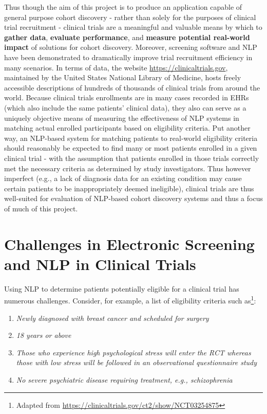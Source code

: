 \documentclass[../main.tex]{subfiles}
\begin{document}
Thus though the aim of this project is to produce an application capable of general purpose cohort discovery - rather than solely for the purposes of clinical trial recruitment - clinical trials are a meaningful and valuable means by which to \textbf{gather data}, \textbf{evaluate performance}, and \textbf{measure potential real-world impact} of solutions for cohort discovery. Moreover, screening software and NLP have been demonstrated to dramatically improve trial recruitment efficiency in many scenarios.
In terms of data, the website \url{https://clinicaltrials.gov}, maintained by the United States National Library of Medicine, hosts freely accessible descriptions of hundreds of thousands of clinical trials from around the world. Because clinical trials enrollments are in many cases recorded in EHRs (which also include the same patients' clinical data), they also can serve as a uniquely objective means of measuring the effectiveness of NLP systems in matching actual enrolled participants based on eligibility criteria. Put another way, an NLP-based system for matching patients to real-world eligibility criteria should reasonably be expected to find many or most patients enrolled in a given clinical trial - with the assumption that patients enrolled in those trials correctly met the necessary criteria as determined by study investigators. Thus however imperfect (e.g., a lack of diagnosis data for an existing condition may cause certain patients to be inappropriately deemed ineligible), clinical trials are thus well-suited for evaluation of NLP-based cohort discovery systems and thus a focus of much of this project.

\section{Challenges in Electronic Screening and NLP in Clinical Trials}

Using NLP to determine patients potentially eligible for a clinical trial has numerous challenges. Consider, for example, a list of eligibility criteria such as\footnote{Adapted from  \url{https://clinicaltrials.gov/ct2/show/NCT03254875}}:

\begin{enumerate}
    \itemsep0em 
    \item \textit{Newly diagnosed with breast cancer and scheduled for surgery}
    \item \textit{18 years or above}
    \item \textit{Those who experience high psychological stress will enter the RCT whereas those with low stress will be followed in an observational questionnaire study}
    \item \textit{No severe psychiatric disease requiring treatment, e.g., schizophrenia}
\end{enumerate}
\end{document}
